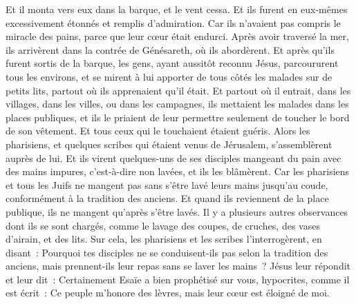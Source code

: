 \begin{multicols}{2}
Et il monta vers eux dans la barque, et le vent cessa. Et ils furent en eux-mêmes excessivement étonnés et remplis d'admiration.
Car ils n'avaient pas compris le miracle des pains, parce que leur cœur était endurci.
Après avoir traversé la mer, ils arrivèrent dans la contrée de Génésareth, où ils abordèrent.
Et après qu'ils furent sortis de la barque, les gens, ayant aussitôt reconnu Jésus,
parcoururent tous les environs, et se mirent à lui apporter de tous côtés les malades sur de petits lits, partout où ils apprenaient qu'il était.
Et partout où il entrait, dans les villages, dans les villes, ou dans les campagnes, ils mettaient les malades dans les places publiques, et ils le priaient de leur permettre seulement de toucher le bord de son vêtement. Et tous ceux qui le touchaient étaient guéris.
\VerseOne{}Alors les pharisiens, et quelques scribes qui étaient venus de Jérusalem, s'assemblèrent auprès de lui.
Et ils virent quelques-uns de ses disciples mangeant du pain avec des mains impures, c'est-à-dire non lavées, et ils les blâmèrent.
Car les pharisiens et tous les Juifs ne mangent pas sans s'être lavé leurs mains jusqu'au coude, conformément à la tradition des anciens.
Et quand ils reviennent de la place publique, ils ne mangent qu'après s'être lavés. Il y a plusieurs autres observances dont ils se sont chargés, comme le lavage des coupes, de cruches, des vases d'airain, et des lits.
Sur cela, les pharisiens et les scribes l'interrogèrent, en disant~: Pourquoi tes disciples ne se conduisent-ils pas selon la tradition des anciens, mais prennent-ils leur repas sans se laver les mains~?
Jésus leur répondit et leur dit~: Certainement Esaïe a bien prophétisé sur vous, hypocrites, comme il est écrit~: Ce peuple m'honore des lèvres, mais leur cœur est éloigné de moi.

\end{multicols}
